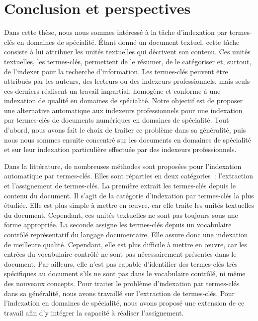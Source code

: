 \chapter{Conclusion et perspectives}
\label{chap:main-conclusion}

  Dans cette thèse, nous nous sommes intéressé à la tâche d'indexation par
  termes-clés en domaines de spécialité. Étant donné un document textuel, cette
  tâche consiste à lui attribuer les unités textuelles qui décrivent son
  contenu. Ces unités textuelles, les termes-clés, permettent de le résumer, de
  le catégoriser et, surtout, de l'indexer pour la recherche d'information. Les
  termes-clés peuvent être attribués par les auteurs, des lecteurs ou des
  indexeurs professionnels, mais seuls ces derniers réalisent un travail
  impartial, homogène et conforme à une indexation de qualité en domaines de
  spécialité. Notre objectif est de proposer une alternative automatique aux
  indexeurs professionnels pour une indexation par termes-clés de documents
  numériques en domaines de spécialité. Tout d'abord, nous avons fait le choix
  de traiter ce problème dans sa généralité, puis nous nous sommes ensuite
  concentré sur les documents en domaines de spécialité et sur leur indexation
  particulière effectuée par des indexeurs professionnels.

  Dans la littérature, de nombreuses méthodes sont proposées pour l'indexation
  automatique par termes-clés. Elles sont réparties en deux catégories~:
  l'extraction et l'assignement de termes-clés. La première extrait les
  termes-clés depuis le contenu du document. Il s'agit de la catégorie
  d'indexation par termes-clés la plus étudiée. Elle est plus simple à mettre en
  \oe{}uvre, car elle traite les unités textuelles du document. Cependant, ces
  unités textuelles ne sont pas toujours sous une forme appropriée. La seconde
  assigne les termes-clés depuis un vocabulaire contrôlé représentatif du
  langage documentaire. Elle assure donc une indexation de meilleure qualité.
  Cependant, elle est plus difficile à mettre en \oe{}uvre, car les entrées du
  vocabulaire contrôlé ne sont pas nécessairement présentes dans le document.
  Par ailleurs, elle n'est pas capable d'identifier des termes-clés très
  spécifiques au document s'ils ne sont pas dans le vocabulaire contrôlé, ni
  même des nouveaux concepts. Pour traiter le problème d'indexation par
  termes-clés dans sa généralité, nous avons travaillé sur l'extraction de
  termes-clés. Pour l'indexation en domaines de spécialité, nous avons proposé
  une extension de ce travail afin d'y intégrer la capacité à réaliser
  l'assignement.

